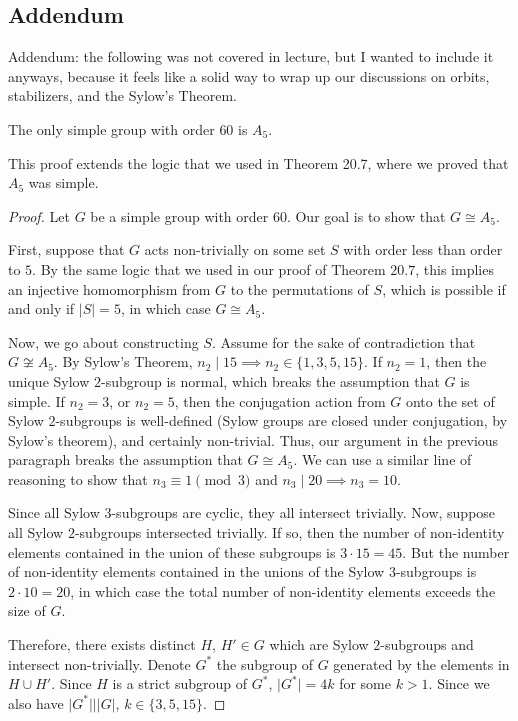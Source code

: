\subsection{Addendum}

Addendum: the following was not covered in lecture, but I wanted to include it anyways, because it feels like a solid way to wrap up our discussions on orbits, stabilizers, and the Sylow's Theorem. 

\begin{theorem}
\thmlabel 

The only simple group with order $60$ is $A_5$. 
\end{theorem}

This proof extends the logic that we used in Theorem 20.7, where we proved that $A_5$ was simple.

\begin{proof}
Let $G$ be a simple group with order $60$. Our goal is to show that $G\cong A_5$. 

First, suppose that $G$ acts non-trivially on some set $S$ with order less than order to $5$. By the same logic that we used in our proof of Theorem $20.7$, this implies an injective homomorphism from $G$ to the permutations of $S$, which is possible if and only if $\vert S\vert = 5$, in which case $G\cong A_5$. 

Now, we go about constructing $S$. Assume for the sake of contradiction that $G\not\cong A_5$. By Sylow's Theorem, $n_2\mid 15\implies n_2\in\{1,3,5,15\}$. If $n_2=1$, then the unique Sylow $2$-subgroup is normal, which breaks the assumption that $G$ is simple. If $n_2=3$, or $n_2=5$, then the conjugation action from $G$ onto the set of Sylow $2$-subgroups is well-defined (Sylow groups are closed under conjugation, by Sylow's theorem), and certainly non-trivial. Thus, our argument in the previous paragraph breaks the assumption that $G\cong A_5$. We can use a similar line of reasoning to show that $n_3\equiv 1\pmod{3}$ and $n_3\mid 20 \implies n_3=10$. 

Since all Sylow $3$-subgroups are cyclic, they all intersect trivially. Now, suppose all Sylow $2$-subgroups intersected trivially. If so, then the number of non-identity elements contained in the union of these subgroups is $3\cdot 15=45$. But the number of non-identity elements contained in the unions of the Sylow $3$-subgroups is $2\cdot 10 = 20$, in which case the total number of non-identity elements exceeds the size of $G$. 

Therefore, there exists distinct $H$, $H'\in G$ which are Sylow $2$-subgroups and intersect non-trivially. Denote $G^*$ the subgroup of $G$ generated by the elements in $H\cup H'$. Since $H$ is a strict subgroup of $G^*$, $\vert G^*\vert = 4k$ for some $k > 1$. Since we also have $\vert G^*\vert \mid \vert G\vert$, $k\in \{3,5,15\}$. 


\end{proof}
